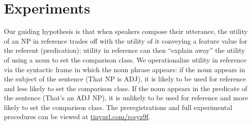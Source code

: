 \documentclass[10pt,letterpaper]{article}
\begin{document}

\section{Experiments}
Our guiding hypothesis is that when speakers compose their utterance, the utility of an NP in reference trades off with the utility of it conveying a feature value for the referent (predication); utility in reference can then ``explain away'' the utility of using a noun to set the comparison class. 
We operationalize utility in reference via the syntactic frame in which the noun phrase appears: if the noun appears in the subject of the sentence (That NP is ADJ), it is likely to be used for reference and less likely to set the comparison class. If the noun appears in the predicate of the sentence (That's an ADJ NP), it is unlikely to be used for reference and more likely to set the comparison class. 
The preregistrations and full experimental procedures can be viewed at \url{tinyurl.com/rcsyz9f}.



\end{document}

